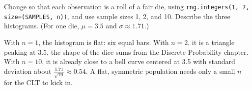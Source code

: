 \begin{Exercise}[title={Dice Averages}, label=clt_dice]
Change  so that each observation is a roll of a fair die,
using \texttt{rng.integers(1, 7, size=(SAMPLES, n))}, and use sample sizes 1, 2,
and 10. Describe the three histograms. (For one die, $\mu = 3.5$ and $\sigma \approx 1.71$.)
\end{Exercise}
\begin{Answer}[ref=clt_dice]
With $n = 1$, the histogram is flat: six equal bars. With $n = 2$, it is a triangle peaking
at 3.5, the shape of the dice sums from the Discrete Probability chapter. With $n = 10$, it is
already close to a bell curve centered at 3.5 with standard deviation about
$\frac{1.71}{\sqrt{10}} \approx 0.54$. A flat, symmetric population needs only a small $n$ for
the CLT to kick in.
\end{Answer}
